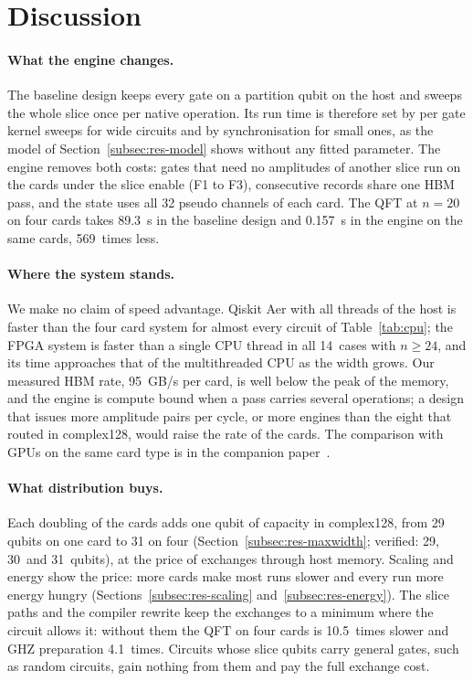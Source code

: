 \documentclass[pdflatex,sn-mathphys-num]{sn-jnl}
\newcommand{\NumAblGhzFourAllOff}{4.1}
\newcommand{\NumAblQftFourAllOff}{10.5}
\newcommand{\NumCpuWideCases}{14}
\newcommand{\NumHbmPerCard}{95}
\newcommand{\NumHostRevisedQftTwenty}{0.157}
\newcommand{\NumHostSubmittedQftTwenty}{89.3}
\newcommand{\NumMaxWidthFourCards}{31}
\newcommand{\NumMaxWidthOneCard}{29}
\newcommand{\NumMaxWidthTwoCards}{30}
\newcommand{\NumSubmittedOverRevisedQftTwenty}{569}
\theoremstyle{thmstyleone}
\theoremstyle{thmstylethree}
\begin{document}
\section{Discussion}\label{sec:discussion}

\paragraph{What the engine changes.} The baseline design keeps every gate on a partition qubit on the host and sweeps
the whole slice once per native operation. Its run time is therefore set by per gate kernel sweeps for wide circuits
and by synchronisation for small ones, as the model of Section~\ref{subsec:res-model} shows without any fitted
parameter. The engine removes both costs: gates that need no amplitudes of another slice run on the cards under
the slice enable (F1 to F3), consecutive records share one HBM pass, and the state uses all 32 pseudo channels of each
card. The QFT at $n=20$ on four cards takes \NumHostSubmittedQftTwenty~s in the baseline design and
\NumHostRevisedQftTwenty~s in the engine on the same cards, \NumSubmittedOverRevisedQftTwenty~times less.

\paragraph{Where the system stands.} We make no claim of speed advantage. Qiskit Aer with all threads of the host is
faster than the four card system for almost every circuit of Table~\ref{tab:cpu}; the FPGA system is faster than a
single CPU thread in all \NumCpuWideCases~cases with $n\ge 24$, and its time approaches that of the multithreaded CPU as
the width grows. Our measured HBM rate, \NumHbmPerCard~GB/s per card, is well below the peak of the memory, and the engine is compute bound
when a pass carries several operations; a design that issues more amplitude pairs per cycle, or more engines than the
eight that routed in complex128, would raise the rate of the cards. The comparison with GPUs on the same card type is in
the companion paper~\cite{tiwari2026fpga30}.

\paragraph{What distribution buys.} Each doubling of the cards adds one qubit of capacity in complex128, from 29 qubits on
one card to 31 on four (Section~\ref{subsec:res-maxwidth}; verified: \NumMaxWidthOneCard, \NumMaxWidthTwoCards~and
\NumMaxWidthFourCards~qubits), at the price of exchanges through host memory. Scaling and energy show the price:
more cards make most runs slower and every run more energy hungry (Sections~\ref{subsec:res-scaling}
and~\ref{subsec:res-energy}). The slice paths and the compiler rewrite keep the exchanges to a minimum where the circuit
allows it: without them the QFT on four cards is \NumAblQftFourAllOff~times slower and GHZ preparation
\NumAblGhzFourAllOff~times. Circuits whose slice qubits carry general gates, such as random circuits, gain nothing from
them and pay the full exchange cost.
\end{document}
